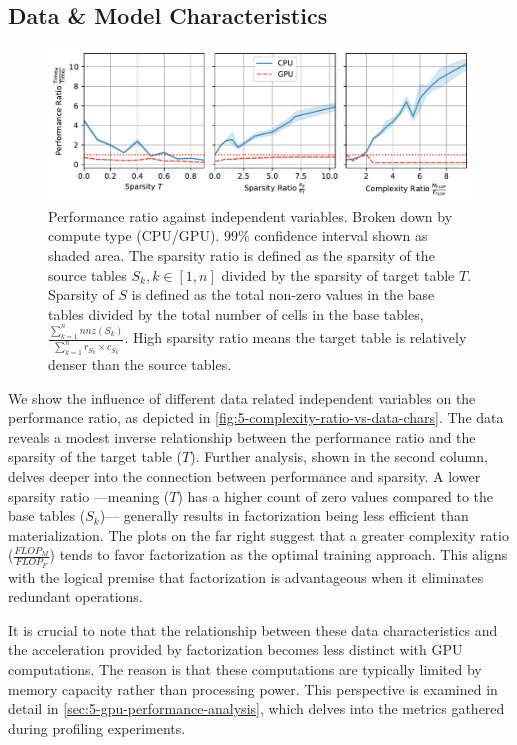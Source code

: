 \subsection{Data \& Model Characteristics}
\begin{figure}[ht]
    \centering
    \includegraphics[width=\linewidth]{chapters/05_cost_estimation/figures/motivation_perf_ratio_vs_data_chars.pdf}
    \caption[Performance ratio for various data characteristics]{Performance ratio against independent variables. Broken down by compute type (CPU/GPU). $99\%$ confidence interval shown as shaded area. The sparsity ratio is defined as the sparsity of the source tables $S_k, k\in[1,n]$ divided by the sparsity of target table $T$. Sparsity of $S$ is defined as the total non-zero values in the base tables divided by the total number of cells in the base tables, $\frac{\sum_{k=1}^{n} nnz(S_k)}{\sum_{k=1}^{n} r_{S_k} \times c_{S_k}}$. High sparsity ratio means the target table is relatively denser than the source tables.}
    \label{fig:5-complexity-ratio-vs-data-chars}
\end{figure}
We show the influence of different data related independent variables on the performance ratio, as depicted in \autoref{fig:5-complexity-ratio-vs-data-chars}. The data reveals a modest inverse relationship between the performance ratio and the sparsity of the target table ($T$). Further analysis, shown in the second column, delves deeper into the connection between performance and sparsity. A lower sparsity ratio —meaning ($T$) has a higher count of zero values compared to the base tables ($S_k$)— generally results in factorization being less efficient than materialization. The plots on the far right suggest that a greater complexity ratio ($\frac{FLOP_M}{FLOP_F}$) tends to favor factorization as the optimal training approach. This aligns with the logical premise that factorization is advantageous when it eliminates redundant operations.

It is crucial to note that the relationship between these data characteristics and the acceleration provided by factorization becomes less distinct with GPU computations. The reason is that these computations are typically limited by memory capacity rather than processing power. This perspective is examined in detail in \autoref{sec:5-gpu-performance-analysis}, which delves into the metrics gathered during profiling experiments.

